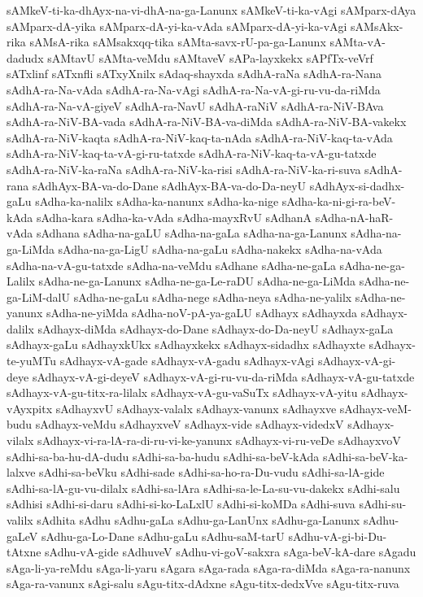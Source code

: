 {sAMkeV-ti-ka-dhAyx-na-vi-dhA-na-ga-Lanunx
sAMkeV-ti-ka-vAgi
sAMparx-dAya
sAMparx-dA-yika
sAMparx-dA-yi-ka-vAda
sAMparx-dA-yi-ka-vAgi
sAMsAkx-rika
sAMsA-rika
sAMsakxqq-tika
sAMta-savx-rU-pa-ga-Lanunx
sAMta-vA-dadudx
sAMtavU
sAMta-veMdu
sAMtaveV
sAPa-layxkekx
sAPfTx-veVrf
sATxlinf
sATxnfli
sATxyXnilx
sAdaq-shayxda
sAdhA-raNa
sAdhA-ra-Nana
sAdhA-ra-Na-vAda
sAdhA-ra-Na-vAgi
sAdhA-ra-Na-vA-gi-ru-vu-da-riMda
sAdhA-ra-Na-vA-giyeV
sAdhA-ra-NavU
sAdhA-raNiV
sAdhA-ra-NiV-BAva
sAdhA-ra-NiV-BA-vada
sAdhA-ra-NiV-BA-va-diMda
sAdhA-ra-NiV-BA-vakekx
sAdhA-ra-NiV-kaqta
sAdhA-ra-NiV-kaq-ta-nAda
sAdhA-ra-NiV-kaq-ta-vAda
sAdhA-ra-NiV-kaq-ta-vA-gi-ru-tatxde
sAdhA-ra-NiV-kaq-ta-vA-gu-tatxde
sAdhA-ra-NiV-ka-raNa
sAdhA-ra-NiV-ka-risi
sAdhA-ra-NiV-ka-ri-suva
sAdhA-rana
sAdhAyx-BA-va-do-Dane
sAdhAyx-BA-va-do-Da-neyU
sAdhAyx-si-dadhx-gaLu
sAdha-ka-nalilx
sAdha-ka-nanunx
sAdha-ka-nige
sAdha-ka-ni-gi-ra-beV-kAda
sAdha-kara
sAdha-ka-vAda
sAdha-mayxRvU
sAdhanA
sAdha-nA-haR-vAda
sAdhana
sAdha-na-gaLU
sAdha-na-gaLa
sAdha-na-ga-Lanunx
sAdha-na-ga-LiMda
sAdha-na-ga-LigU
sAdha-na-gaLu
sAdha-nakekx
sAdha-na-vAda
sAdha-na-vA-gu-tatxde
sAdha-na-veMdu
sAdhane
sAdha-ne-gaLa
sAdha-ne-ga-Lalilx
sAdha-ne-ga-Lanunx
sAdha-ne-ga-Le-raDU
sAdha-ne-ga-LiMda
sAdha-ne-ga-LiM-dalU
sAdha-ne-gaLu
sAdha-nege
sAdha-neya
sAdha-ne-yalilx
sAdha-ne-yanunx
sAdha-ne-yiMda
sAdha-noV-pA-ya-gaLU
sAdhayx
sAdhayxda
sAdhayx-dalilx
sAdhayx-diMda
sAdhayx-do-Dane
sAdhayx-do-Da-neyU
sAdhayx-gaLa
sAdhayx-gaLu
sAdhayxkUkx
sAdhayxkekx
sAdhayx-sidadhx
sAdhayxte
sAdhayx-te-yuMTu
sAdhayx-vA-gade
sAdhayx-vA-gadu
sAdhayx-vAgi
sAdhayx-vA-gi-deye
sAdhayx-vA-gi-deyeV
sAdhayx-vA-gi-ru-vu-da-riMda
sAdhayx-vA-gu-tatxde
sAdhayx-vA-gu-titx-ra-lilalx
sAdhayx-vA-gu-vaSuTx
sAdhayx-vA-yitu
sAdhayx-vAyxpitx
sAdhayxvU
sAdhayx-valalx
sAdhayx-vanunx
sAdhayxve
sAdhayx-veM-budu
sAdhayx-veMdu
sAdhayxveV
sAdhayx-vide
sAdhayx-videdxV
sAdhayx-vilalx
sAdhayx-vi-ra-lA-ra-di-ru-vi-ke-yanunx
sAdhayx-vi-ru-veDe
sAdhayxvoV
sAdhi-sa-ba-hu-dA-dudu
sAdhi-sa-ba-hudu
sAdhi-sa-beV-kAda
sAdhi-sa-beV-ka-lalxve
sAdhi-sa-beVku
sAdhi-sade
sAdhi-sa-ho-ra-Du-vudu
sAdhi-sa-lA-gide
sAdhi-sa-lA-gu-vu-dilalx
sAdhi-sa-lAra
sAdhi-sa-le-La-su-vu-dakekx
sAdhi-salu
sAdhisi
sAdhi-si-daru
sAdhi-si-ko-LaLxlU
sAdhi-si-koMDa
sAdhi-suva
sAdhi-su-valilx
sAdhita
sAdhu
sAdhu-gaLa
sAdhu-ga-LanUnx
sAdhu-ga-Lanunx
sAdhu-gaLeV
sAdhu-ga-Lo-Dane
sAdhu-gaLu
sAdhu-saM-tarU
sAdhu-vA-gi-bi-Du-tAtxne
sAdhu-vA-gide
sAdhuveV
sAdhu-vi-goV-sakxra
sAga-beV-kA-dare
sAgadu
sAga-li-ya-reMdu
sAga-li-yaru
sAgara
sAga-rada
sAga-ra-diMda
sAga-ra-nanunx
sAga-ra-vanunx
sAgi-salu
sAgu-titx-dAdxne
sAgu-titx-dedxVve
sAgu-titx-ruva
}
